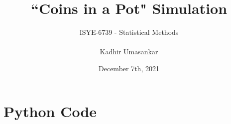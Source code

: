 \documentclass[12pt]{report}
\author{ISYE-6739 - Statistical Methods \\\\ Kadhir Umasankar}
\title{``Coins in a Pot" Simulation}
\date{December 7th, 2021}
\theoremstyle{definition}
\begin{document}
\maketitle











\appendix
\chapter{Python Code}
\label{pythoncode}
\inputminted[linenos=true, breaklines=true, breakanywhere=true, fontsize=\footnotesize]{python}{../dice-game.py}
\end{document}
